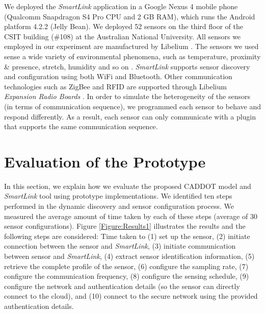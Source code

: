 \documentclass[graybox]{svmult}
\begin{document}
We deployed the \textit{SmartLink} application in a Google Nexus 4 mobile phone (Qualcomm Snapdragon S4 Pro CPU and 2 GB RAM), which runs the Android platform 4.2.2 (Jelly Bean). We deployed 52 sensors on the third floor of the CSIT building (\#108) at the Australian National University. All sensors we employed in our experiment are manufactured by Libelium \cite{P595}. The sensors we used sense a wide variety of environmental phenomena, such as temperature, proximity \& presence, stretch, humidity and so on \cite{P595}. \textit{SmartLink} supports sensor discovery and configuration using both WiFi and Bluetooth. Other communication technologies such as ZigBee  and RFID are supported through Libelium \textit{Expansion Radio Boards} \cite{P595}. In order to simulate the heterogeneity of the sensors (in terms of communication sequence), we programmed each sensor to behave and respond differently. As a result, each sensor can only communicate with a plugin that supports the same communication sequence.









\section{Evaluation of the Prototype}
\label{sec:Evaluation_of the_Prototype}

In this section, we explain how we evaluate the proposed CADDOT model  and \textit{SmartLink} tool  using prototype implementations. We identified ten steps performed in the dynamic discovery and sensor configuration process. We measured the average amount of time taken by each of these steps (average of 30 sensor configurations). Figure \ref{Figure:Results1} illustrates the results and the following steps are considered: 
Time taken to (1) set up the sensor, (2) initiate connection between the sensor and \textit{SmartLink}, (3) initiate communication between sensor and \textit{SmartLink}, (4) extract sensor identification information, (5) retrieve the complete profile of the sensor, (6) configure the sampling rate, (7) configure the communication  frequency, (8) configure  the sensing schedule, (9) configure the network and authentication  details (so the sensor can directly connect to the cloud), and (10) connect to the secure network using the provided authentication details.
\end{document}
